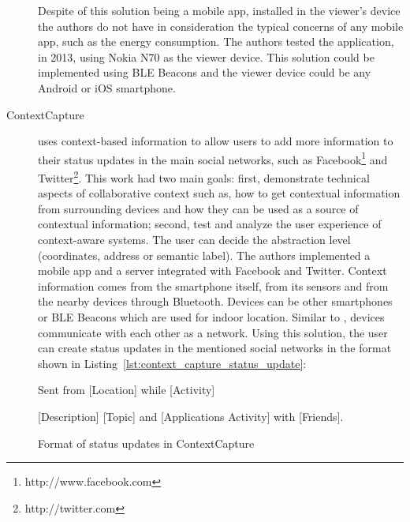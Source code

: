 \begin{description}
  Despite of this solution being a mobile app, installed
  in the viewer's device the authors do not have in
  consideration the typical concerns of any mobile app,
  such as the energy consumption.
  The authors tested the application, in 2013,
  using Nokia N70 as the viewer device.
  This solution could be implemented using \gls{BLE} Beacons
  and the viewer device could be any Android or iOS smartphone.
  \item[ContextCapture\cite{Antila2011}]
  uses context-based information to allow users to
  add more information to their status updates
  in the main social networks, such as
  Facebook\footnote{http://www.facebook.com} and
  Twitter\footnote{http://twitter.com}.
  This work had two main goals: first, demonstrate technical
  aspects of collaborative context such as,
  how to get contextual information from
  surrounding devices and how they can be used
  as a source of contextual information;
  second, test and analyze the user experience of
  context-aware systems.
  The user can decide the abstraction level (coordinates,
  address or semantic label).
  The authors implemented a mobile app and a
  server integrated with Facebook and Twitter.
  Context information comes from the smartphone itself,
  from its sensors and from the nearby devices through
  Bluetooth.
  Devices can be other smartphones or \gls{BLE} Beacons which
  are used for indoor location.
  Similar to \cite{BenAbdesslem2014}, devices communicate
  with each other as a network.
  Using this solution, the user can create status updates
  in the mentioned social networks in the format shown in Listing~\ref{lst:context_capture_status_update}:
  \begin{listing}

      Sent from [Location] while [Activity]

      [Description] [Topic] and [Applications Activity] with
      [Friends].
    \caption[ContextCapture update format]{Format of status updates in ContextCapture}
    \label{lst:context_capture_status_update}
  \end{listing}
\end{description}


